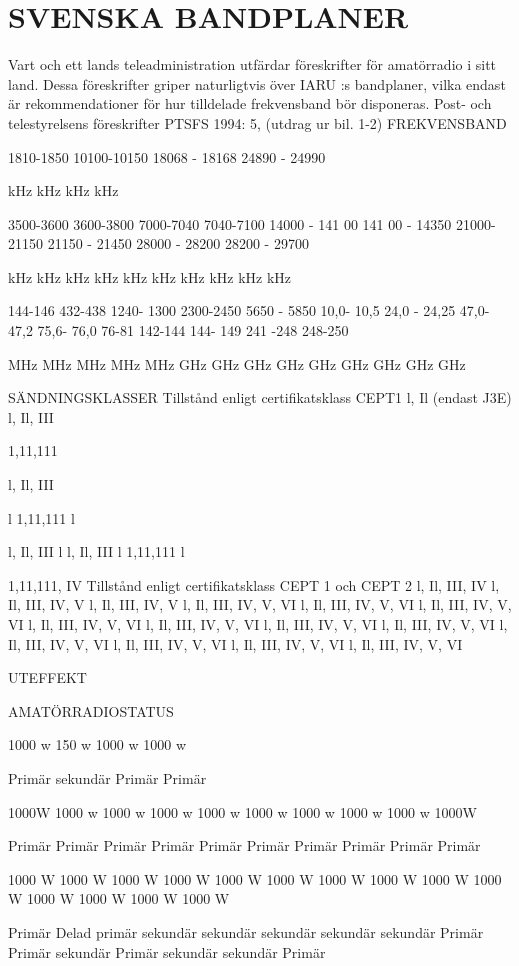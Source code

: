 \chapter{SVENSKA BANDPLANER}
Vart och ett lands teleadministration utfärdar föreskrifter för amatörradio i sitt land. Dessa
föreskrifter griper naturligtvis över IARU :s bandplaner, vilka endast är rekommendationer för
hur tilldelade frekvensband bör disponeras.
Post- och telestyrelsens föreskrifter PTSFS 1994: 5, (utdrag ur bil. 1-2)
FREKVENSBAND

1810-1850
10100-10150
18068 - 18168
24890 - 24990

kHz
kHz
kHz
kHz

3500-3600
3600-3800
7000-7040
7040-7100
14000 - 141 00
141 00 - 14350
21000-21150
21150 - 21450
28000 - 28200
28200 - 29700

kHz
kHz
kHz
kHz
kHz
kHz
kHz
kHz
kHz
kHz

144-146
432-438
1240- 1300
2300-2450
5650 - 5850
10,0- 10,5
24,0 - 24,25
47,0- 47,2
75,6- 76,0
76-81
142-144
144- 149
241 -248
248-250

MHz
MHz
MHz
MHz
MHz
GHz
GHz
GHz
GHz
GHz
GHz
GHz
GHz
GHz

SÄNDNINGSKLASSER
Tillstånd enligt
certifikatsklass
CEPT1
l, Il (endast J3E)
l, Il, III

1,11,111

l, Il, III

l
1,11,111
l

l, Il, III
l
l, Il, III
l
1,11,111
l

1,11,111, IV
Tillstånd enligt
certifikatsklass
CEPT 1 och CEPT 2
l, Il, III, IV
l, Il, III, IV, V
l, Il, III, IV, V
l, Il, III, IV, V, VI
l, Il, III, IV, V, VI
l, Il, III, IV, V, VI
l, Il, III, IV, V, VI
l, Il, III, IV, V, VI
l, Il, III, IV, V, VI
l, Il, III, IV, V, VI
l, Il, III, IV, V, VI
l, Il, III, IV, V, VI
l, Il, III, IV, V, VI
l, Il, III, IV, V, VI

UTEFFEKT

AMATÖRRADIOSTATUS

1000 w
150 w
1000 w
1000 w

Primär
sekundär
Primär
Primär

1000W
1000 w
1000 w
1000 w
1000 w
1000 w
1000 w
1000 w
1000 w
1000W

Primär
Primär
Primär
Primär
Primär
Primär
Primär
Primär
Primär
Primär

1000 W
1000 W
1000 W
1000 W
1000 W
1000 W
1000 W
1000 W
1000 W
1000 W
1000 W
1000 W
1000 W
1000 W

Primär
Delad primär
sekundär
sekundär
sekundär
sekundär
sekundär
Primär
Primär
sekundär
Primär
sekundär
sekundär
Primär

